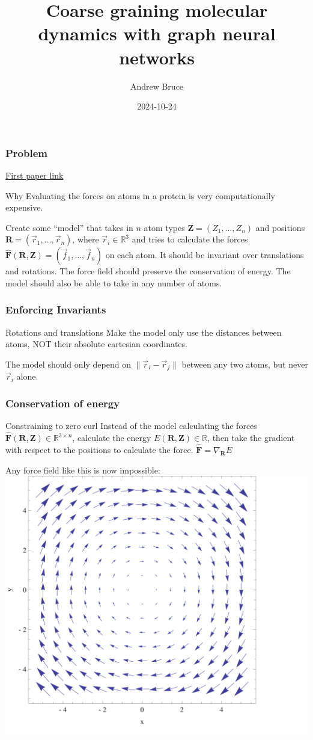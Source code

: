 \documentclass{beamer}
\title{Coarse graining molecular dynamics with graph neural networks}
\author{Andrew Bruce\inst{1}}
\institute[UCSC] {
  \inst{1}
  University Of California, Santa Cruz
}
\date{2024-10-24}
\begin{document}
\frame{\titlepage}
\begin{frame}
  \frametitle{Problem}
  \href{https://arxiv.org/abs/1706.08566}{First paper link}
  \begin{block}{Why}
    Evaluating the forces on atoms in a protein is very computationally expensive.
  \end{block}
  Create some ``model'' that takes in $n$ atom types $\mathbf{Z} = ( Z_1, \dots, Z_n)$ and positions $\mathbf{R} = ( \vec{r}_1, \dots, \vec{r}_n )$, where $ \vec{r}_i \in \mathbb{R}^3$ and tries to calculate the forces $\mathbf{\hat{F}}(\mathbf{R}, \mathbf{Z}) = ( \vec{f}_1, \dots, \vec{f}_n )$ on each atom. It should be \alert{invariant} over translations and rotations. The force field should preserve the conservation of energy. The model should also be able to take in \alert{any number} of atoms.
\end{frame}
\begin{frame}
  \frametitle{Enforcing Invariants}
  \begin{block}{Rotations and translations}
    Make the model only use the distances between atoms, \alert{NOT} their absolute cartesian coordinates.
  \end{block}
  The model should only depend on $\| \vec{r}_i - \vec{r}_j \|$ between any two atoms, but \alert{never} $\vec{r}_i$ alone.
\end{frame}
\begin{frame}
  \frametitle{Conservation of energy}
  \begin{block}{Constraining to zero curl}
    Instead of the model calculating the forces $\mathbf{\hat{F}}(\mathbf{R}, \mathbf{Z}) \in \mathbb{R}^{3 \times n}$, calculate the energy $E(\mathbf{R}, \mathbf{Z}) \in \mathbb{R}$, then take the \alert{gradient with respect to the positions} to calculate the force.
    $\mathbf{\hat{F}} = \nabla_{\mathbf{R}} E$
  \end{block}
  Any force field like this is now impossible: \includegraphics[width=0.35\linewidth]{./curl.png}
\end{frame}
\end{document}
